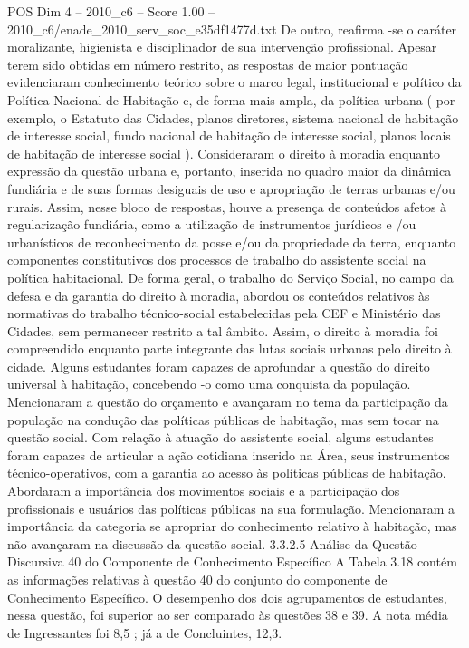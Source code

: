 \begin{textsample}{POS Dim 4 – 2010\_c6 – Score 1.00 – 2010\_c6/enade\_2010\_serv\_soc\_e35df1477d.txt}
De outro, reafirma -se o caráter moralizante, higienista e disciplinador de sua intervenção profissional.
Apesar terem sido obtidas em número restrito, as respostas de maior pontuação evidenciaram conhecimento teórico sobre o marco legal, institucional e político da Política Nacional de Habitação e, de forma mais ampla, da política urbana ( por exemplo, o Estatuto das Cidades, planos diretores, sistema nacional de habitação de interesse social, fundo nacional de habitação de interesse social, planos locais de habitação de interesse social ).
Consideraram o direito à moradia enquanto expressão da questão urbana e, portanto, inserida no quadro maior da dinâmica fundiária e de suas formas desiguais de uso e apropriação de terras urbanas e/ou rurais.
Assim, nesse bloco de respostas, houve a presença de conteúdos afetos à regularização fundiária, como a utilização de instrumentos jurídicos e /ou urbanísticos de reconhecimento da posse e/ou da propriedade da terra, enquanto componentes constitutivos dos processos de trabalho do assistente social na política habitacional.
De forma geral, o trabalho do Serviço Social, no campo da defesa e da garantia do direito à moradia, abordou os conteúdos relativos às normativas do trabalho técnico-social estabelecidas pela CEF e Ministério das Cidades, sem permanecer restrito a tal âmbito.
Assim, o direito à moradia foi compreendido enquanto parte integrante das lutas sociais urbanas pelo direito à cidade.
Alguns estudantes foram capazes de aprofundar a questão do direito universal à habitação, concebendo -o como uma conquista da população.
Mencionaram a questão do orçamento e avançaram no tema da participação da população na condução das políticas públicas de habitação, mas sem tocar na questão social.
Com relação à atuação do assistente social, alguns estudantes foram capazes de articular a ação cotidiana inserido na Área, seus instrumentos técnico-operativos, com a garantia ao acesso às políticas públicas de habitação.
Abordaram a importância dos movimentos sociais e a participação dos profissionais e usuários das políticas públicas na sua formulação.
Mencionaram a importância da categoria se apropriar do conhecimento relativo à habitação, mas não avançaram na discussão da questão social. 3.3.2.5 Análise da Questão Discursiva 40 do Componente de Conhecimento Específico A Tabela 3.18 contém as informações relativas à questão 40 do conjunto do componente de Conhecimento Específico.
O desempenho dos dois agrupamentos de estudantes, nessa questão, foi superior ao ser comparado às questões 38 e 39.
A nota média de Ingressantes foi 8,5 ; já a de Concluintes, 12,3.

\end{textsample}
